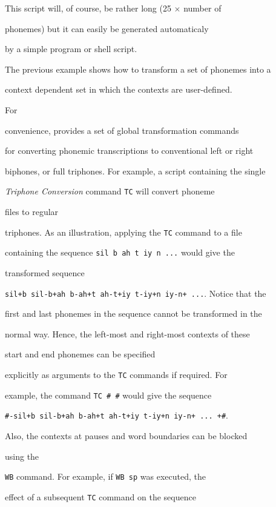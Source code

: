This script will, of course, be rather long (25 $\times$ number of


phonemes) but it can easily be generated automaticaly 


by a simple program or shell script.





The previous example shows how to transform a set of phonemes into a


context dependent set in which the contexts are user-defined.


 For


convenience,  provides a set of global transformation commands


for converting phonemic transcriptions to conventional left or right


biphones, or full triphones.  For example, a script containing the single


{\it Triphone Conversion} command \texttt{TC} will convert phoneme 


files to regular


triphones.  As an illustration, applying the \texttt{TC} command to a file


containing the sequence \texttt{sil b ah t iy n ...} would  give the


transformed sequence 


\texttt{sil+b sil-b+ah b-ah+t ah-t+iy t-iy+n iy-n+ ...}. Notice that the


first and last phonemes in the sequence  cannot be transformed in the


normal way.  Hence, the left-most and right-most contexts of these


start and end phonemes can be specified


explicitly as arguments to the \texttt{TC} commands if required.  For


example, the command \texttt{TC \# \#} would give the sequence


\texttt{\#-sil+b sil-b+ah b-ah+t ah-t+iy t-iy+n iy-n+ ... +\#}.  


Also, the contexts at pauses and word boundaries can be blocked


using the


\texttt{WB} command.   For example, if \texttt{WB sp} was executed, the


effect of a subsequent \texttt{TC} command on the sequence 


